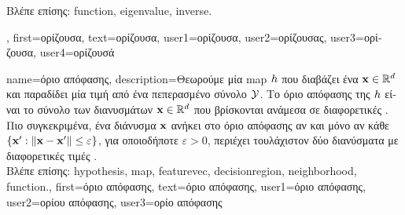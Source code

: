 {{\begin{figure}[H]
\begin{center}
			\end{center}
		\end{figure}
		\foreignlanguage{greek}{Βλέπε επίσης:} \gls{function}, \gls{eigenvalue}, \gls{inverse}.},
	first={\foreignlanguage{greek}{ορίζουσα}},
	text={\foreignlanguage{greek}{ορίζουσα}},
	user1={\foreignlanguage{greek}{ορίζουσα}}, %
	user2={\foreignlanguage{greek}{ορίζουσας}}, %
	user3={\foreignlanguage{greek}{ορίζουσα}}, %
	user4={\foreignlanguage{greek}{ορίζουσά}} %
}

{name={\foreignlanguage{greek}{όριο απόφασης}}, 
	description={\foreignlanguage{greek}{Θεωρούμε μία}  
		\gls{map}  $h$ \foreignlanguage{greek}{που διαβάζει ένα}   
		${\bf x} \in \mathbb{R}^{d}$ \foreignlanguage{greek}{και παραδίδει μία τιμή από ένα πεπερασμένο σύνολο $\mathcal{Y}$. 
		Το όριο απόφασης της $h$ είναι το σύνολο των διανυσμάτων ${\bf x} \in \mathbb{R}^{d}$ 
		που βρίσκονται ανάμεσα σε διαφορετικές} . \foreignlanguage{greek}{Πιο συγκεκριμένα, ένα  
		διάνυσμα ${\bf x}$ ανήκει στο όριο απόφασης αν και μόνο αν κάθε}  
		$\{ {\bf x}': \| {\bf x} - {\bf x}' \| \leq \varepsilon \}$, \foreignlanguage{greek}{για οποιοδήποτε $\varepsilon >0$, περιέχει 
		τουλάχιστον δύο διανύσματα με διαφορετικές τιμές} .\\
		\foreignlanguage{greek}{Βλέπε επίσης:} \gls{hypothesis}, \gls{map}, \gls{featurevec}, \gls{decisionregion}, \gls{neighborhood}, \gls{function}.},
	first={\foreignlanguage{greek}{όριο απόφασης}},
	text={\foreignlanguage{greek}{όριο απόφασης}},
	user1={\foreignlanguage{greek}{όριο απόφασης}}, %
	user2={\foreignlanguage{greek}{ορίου απόφασης}}, %
	user3={\foreignlanguage{greek}{ορίο απόφασης}} %
}

